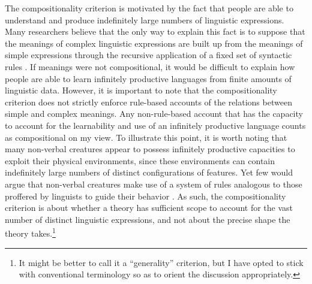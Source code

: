 The compositionality criterion is motivated by the fact that people are able to understand and produce indefinitely large numbers of linguistic expressions. Many researchers believe that the only way to explain this fact is to suppose that the meanings of complex linguistic expressions are built up from the meanings of simple expressions through the recursive application of a fixed set of syntactic rules \citep{Szabo:2012,Szabo:2013,FodorLepore:1991,Recanati:2012,Unnsteinsson:2014,Pinker:1994,FodorPylyshyn:1988,CappelenLepore:2005}. If meanings were not compositional, it would be difficult to explain how people are able to learn infinitely productive languages from finite amounts of linguistic data. However, it is important to note that the compositionality criterion does not strictly enforce rule-based accounts of the relations between simple and complex meanings. Any non-rule-based account that has the capacity to account for the learnability and use of an infinitely productive language counts as compositional on my view. To illustrate this point, it is worth noting that many non-verbal creatures appear to possess infinitely productive capacities to exploit their physical environments, since these environments can contain indefinitely large numbers of distinct configurations of features. Yet few would argue that non-verbal creatures make use of a system of rules analogous to those proffered by linguists to guide their behavior \citep[cf.][]{FodorPylyshyn:1988}. As such, the compositionality criterion is about whether a theory has sufficient scope to account for the vast number of distinct linguistic expressions, and not about the precise shape the theory takes.\footnote{It might be better to call it a ``generality'' criterion, but I have opted to stick with conventional terminology so as to orient the discussion appropriately.}

